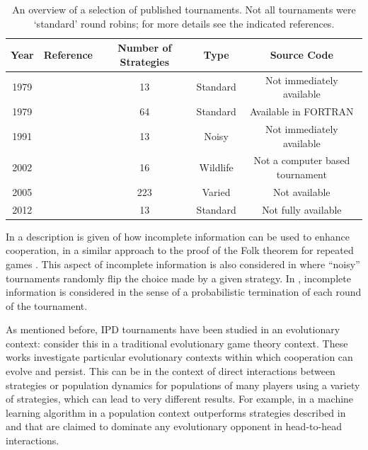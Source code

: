 \documentclass{jors}
\begin{document}
\begin{table}[!hbtp]
    \begin{center}
        \begin{tabular}{ccccc}
            \toprule
            Year     & Reference                  & Number of Strategies & Type     & Source Code\\
            \midrule
            1979     & \cite{Axelrod1980a}        & 13                   & Standard & Not immediately available\\
            1979     & \cite{Axelrod1980b}        & 64                   & Standard & Available in FORTRAN\\
            1991     & \cite{Bendor1991}          & 13                   & Noisy    & Not immediately available\\
            2002     & \cite{Stephens2002}        & 16                   & Wildlife & Not a computer based tournament\\
            2005     & \cite{kendall2007iterated} & 223                  & Varied   & Not available \\
            2012     & \cite{Stewart2012}         & 13                   & Standard & Not fully available \\
            \bottomrule
        \end{tabular}
    \end{center}
    \caption{An overview of a selection of published tournaments. Not all
             tournaments were `standard' round robins; for more details
             see the indicated references.}\label{tab:tournaments}
\end{table}

In \cite{Milgrom1982} a description is given of how incomplete information can
be used to enhance cooperation, in a similar approach to the proof of the Folk
theorem for repeated games \cite{Maschler2013}. This aspect of incomplete
information is also considered in \cite{Bendor1991, Lee2015, Molander1985} where
``noisy'' tournaments randomly flip the choice made by a given strategy. In
\cite{Murnighan2015}, incomplete information is considered in the sense of a
probabilistic termination of each round of the tournament.

As mentioned before, IPD tournaments have been studied in an evolutionary
context: \cite{Ellison1994, Lee2015, Press2012, Stewart2012} consider this in a
traditional evolutionary game theory context. These works investigate
particular evolutionary contexts within which cooperation can evolve and
persist. This can be in the context of direct interactions between strategies
or population dynamics for populations of many players using a variety of
strategies, which can lead to very different results. For example, in
\cite{Lee2015} a machine learning algorithm in a population context outperforms
strategies described in \cite{Press2012} and \cite{Stewart2012} that are
claimed to dominate any evolutionary opponent in head-to-head interactions.
\end{document}
